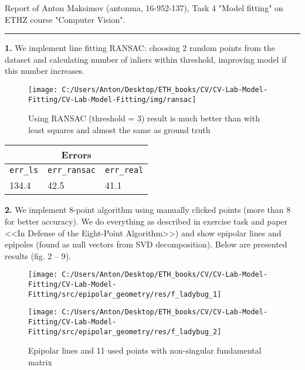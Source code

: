 \documentclass{report}
\begin{document}
\large
Report of Anton Maksimov (antonma, 16-952-137), Task 4 "Model fitting" on ETHZ course "Computer Vision".\\
\rule{\linewidth}{1pt}
	\textbf{1.} We implement line fitting RANSAC: choosing 2 random points from the dataset and calculating number of inliers within threshold, improving model if this number increases.
	\begin{figure}[h]
		\begin{center}
			\begin{minipage}[h]{0.8\linewidth}
				\texttt{[image: C:/Users/Anton/Desktop/ETH\_books/CV/CV-Lab-Model-Fitting/CV-Lab-Model-Fitting/img/ransac]}
			\end{minipage}
		\end{center}
	\caption{Using RANSAC (threshold = 3) result is much better than with least squares and almost the same as ground truth}
	\end{figure}
\begin{center}
\begin{tabular}{|l|l|l|}
	\multicolumn{3}{c}{Errors}\\
	\hline
	\texttt{err\_ls} & \texttt{err\_ransac} & \texttt{err\_real}\\
	\hline
	134.4 & 42.5 & 41.1\\
	\hline
\end{tabular}
\end{center}
\newpage
	\textbf{2.} We implement 8-point algorithm using manually clicked points (more than 8 for better accuracy). We do everything as described in exercise task and paper <<In Defense of the Eight-Point Algorithm>>) and show epipolar lines and epipoles (found as null vectors from SVD decomposition). Below are presented results (fig. 2 -- 9).
	\begin{figure}[h]
		\begin{center}
			\begin{minipage}[h]{0.49\linewidth}
				\texttt{[image: C:/Users/Anton/Desktop/ETH\_books/CV/CV-Lab-Model-Fitting/CV-Lab-Model-Fitting/src/epipolar\_geometry/res/f\_ladybug\_1]}
			\end{minipage}
			\hfill
			\begin{minipage}[h]{0.49\linewidth}
				\texttt{[image: C:/Users/Anton/Desktop/ETH\_books/CV/CV-Lab-Model-Fitting/CV-Lab-Model-Fitting/src/epipolar\_geometry/res/f\_ladybug\_2]}
			\end{minipage}
		\caption{Epipolar lines and 11 used points with non-singular fundamental matrix}
		\end{center}
	\end{figure}
\end{document}
